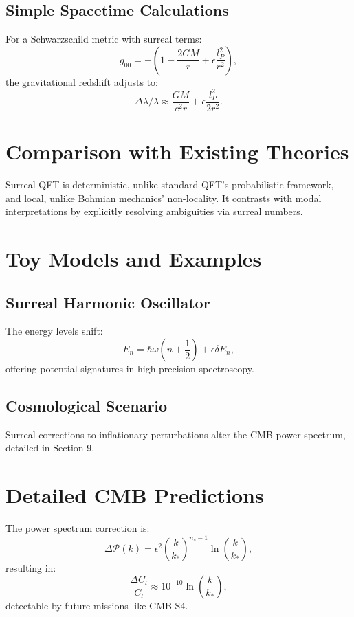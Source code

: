 \documentclass{article}
\begin{document}
\subsection{Simple Spacetime Calculations}
For a Schwarzschild metric with surreal terms:
\begin{equation}
g_{00} = -\left(1 - \frac{2GM}{r} + \epsilon \frac{l_P^2}{r^2}\right),
\end{equation}
the gravitational redshift adjusts to:
\begin{equation}
\Delta \lambda / \lambda \approx \frac{GM}{c^2 r} + \epsilon \frac{l_P^2}{2 r^2}.
\end{equation}

\section{Comparison with Existing Theories}
Surreal QFT is deterministic, unlike standard QFT’s probabilistic framework, and local, unlike Bohmian mechanics’ non-locality. It contrasts with modal interpretations by explicitly resolving ambiguities via surreal numbers.

\section{Toy Models and Examples}
\subsection{Surreal Harmonic Oscillator}
The energy levels shift:
\begin{equation}
E_n = \hbar \omega \left( n + \frac{1}{2} \right) + \epsilon \delta E_n,
\end{equation}
offering potential signatures in high-precision spectroscopy.

\subsection{Cosmological Scenario}
Surreal corrections to inflationary perturbations alter the CMB power spectrum, detailed in Section 9.

\section{Detailed CMB Predictions}
The power spectrum correction is:
\begin{equation}
\Delta \mathcal{P}(k) = \epsilon^2 \left( \frac{k}{k_*} \right)^{n_s-1} \ln \left( \frac{k}{k_*} \right),
\end{equation}
resulting in:
\begin{equation}
\frac{\Delta C_l}{C_l} \approx 10^{-10} \ln \left( \frac{k}{k_*} \right),
\end{equation}
detectable by future missions like CMB-S4.
\end{document}
